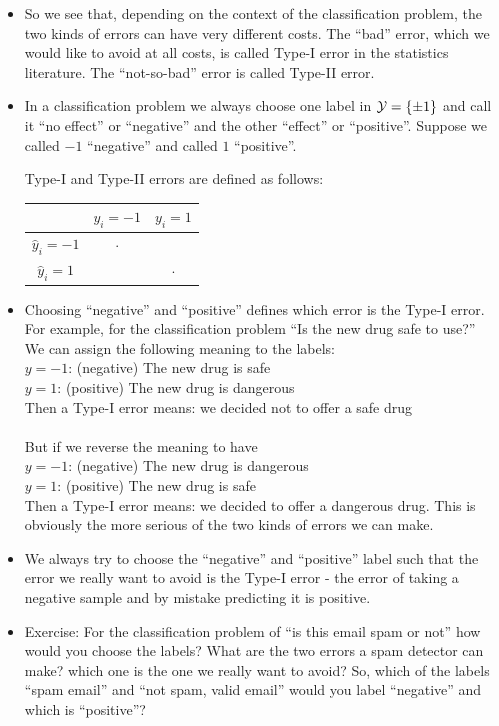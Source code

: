 \documentclass[11pt]{article}
\newcommand{\blue}{\color{blue}}
\newcommand{\red}{\color{red}}
\begin{document}
\begin{itemize}
     \item So we see that, depending on the context of the
       classification problem, the two kinds of errors can have very different
       costs. The ``bad'' error, which we would like to avoid at all costs,
       is called Type-I error in the statistics literature. 
       The ``not-so-bad'' error is called Type-II error.

     \item In a classification problem we always choose one label in $\mathcal{Y}=\left\{
     \pm 1 \right\}$ and call it ``no effect'' or ``negative'' and the other
     ``effect'' or ``positive''. Suppose we called $-1$ ``negative'' and called
     $1$  ``positive''. 


Type-I and Type-II errors are defined as follows:

\begin{table}[h!]
          \centering
          \begin{tabular}{c|c|c}
            & $y_i=-1$ & $y_i=1$ \\ \hline
            $\hat{y}_i=-1$ &  $\cdot$ & \blue{Type-II error} \\ \hline
            $\hat{y}_i=1$ & \red{Type-I error} & $\cdot$ \\ \hline
          \end{tabular}
        \end{table}

      \item Choosing ``negative'' and ``positive'' defines which error is the
	Type-I error. For example, for the classification problem
	 ``Is the new drug safe to use?''\\
    We can assign the following meaning to the labels:\\
    $y=-1$: (negative) The new drug is safe\\
    $y=1$: (positive) The new drug is dangerous\\
           Then a Type-I error means: we decided not to offer a safe drug
\\~\\ 
But if we reverse the meaning to have  \\   
$y=-1$: (negative) The new drug is dangerous\\
$y=1$: (positive) The new drug is safe\\
  	\color{black}
        Then a Type-I error means: we decided to offer a dangerous drug. This is
	obviously the more serious of the two kinds of errors we can make.
  
      \item We always try to choose the ``negative'' and ``positive'' label such
	that the error we really want to avoid is the Type-I error - the error
	of taking a negative  sample and by mistake predicting it is 
	positive. 
  \item Exercise: For the classification problem of ``is this email spam or not'' how would
    you choose the labels? What are the two errors a spam detector can make?
    which one is the one we really want to avoid? So, which of the labels ``spam
    email'' and ``not spam, valid email'' would you label ``negative'' and which
    is ``positive''?
\end{itemize}
\end{document}
